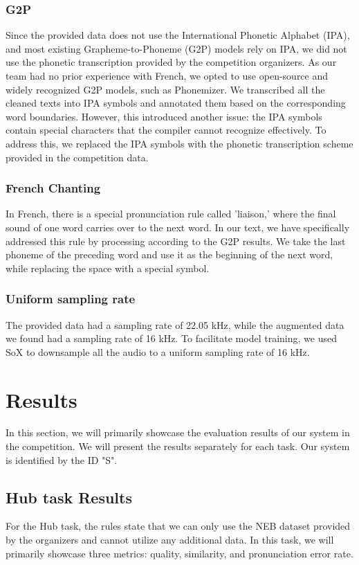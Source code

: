 \documentclass{INTERSPEECH2023}
\begin{document}
\subsubsection{G2P}
Since the provided data does not use the International Phonetic Alphabet (IPA), and most existing Grapheme-to-Phoneme (G2P) models rely on IPA, we did not use the phonetic transcription provided by the competition organizers. As our team had no prior experience with French, we opted to use open-source and widely recognized G2P models, such as Phonemizer\cite{bernard2021phonemizer}. We transcribed all the cleaned texts into IPA symbols and annotated them based on the corresponding word boundaries. However, this introduced another issue: the IPA symbols contain special characters that the compiler cannot recognize effectively. To address this, we replaced the IPA symbols with the phonetic transcription scheme provided in the competition data. 

\subsubsection{French Chanting}

In French, there is a special pronunciation rule called 'liaison,' where the final sound of one word carries over to the next word. In our text, we have specifically addressed this rule by processing according to the G2P results. We take the last phoneme of the preceding word and use it as the beginning of the next word, while replacing the space with a special symbol. 

\subsubsection{Uniform sampling rate}
The provided data had a sampling rate of 22.05 kHz, while the augmented data we found had a sampling rate of 16 kHz. To facilitate model training, we used SoX to downsample all the audio to a uniform sampling rate of 16 kHz.

\section{Results}
In this section, we will primarily showcase the evaluation results of our system in the competition. We will present the results separately for each task. Our system is identified by the ID "S". 

\subsection{Hub task Results}
For the Hub task, the rules state that we can only use the NEB dataset provided by the organizers and cannot utilize any additional data. In this task, we will primarily showcase three metrics: quality, similarity, and pronunciation error rate.
\end{document}
